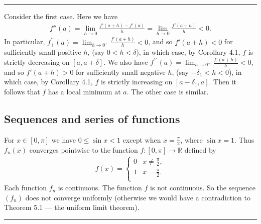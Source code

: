 \documentclass[letterpaper,10pt,english]{jupyterBook}
\begin{document}
\bigskip\hrule\bigskip


\sphinxAtStartPar
{\hyperref[\detokenize{Problems:id53}]{}} Consider the first case. Here we have
\begin{equation*}
\begin{split}
f''(a) = \lim_{h \rightarrow 0}\frac{f'(a + h) - f'(a)}{h} =  \lim_{h \rightarrow 0}\frac{f'(a + h)}{h} < 0.
\end{split}
\end{equation*}
\sphinxAtStartPar
In particular, \(f^{\prime \prime}_{+}(a) = \lim_{h \rightarrow 0^+}\frac{f'(a + h)}{h} < 0\), and so \(f'(a + h) < 0\) for sufficiently small positive \(h\), (say \(0 < h < \delta\)), in which case, by Corollary 4.1, \(f\) is strictly decreasing on \([a,  a + \delta]\). We also have \(f^{\prime \prime}_{-}(a) = \lim_{h \rightarrow 0^-}\frac{f'(a + h)}{h} < 0\), and so \(f'(a + h) > 0\) for sufficiently small negative \(h\), (say \(-\delta_{1} < h < 0\)), in which case, by Corollary 4.1, \(f\) is strictly increasing on \([a- \delta_{1}, a]\). Then it follows that \(f\) has a local minimum at \(a\). The other case is similar.


\subsection{Sequences and series of functions}
\label{\detokenize{Solutions-full:sequences-and-series-of-functions}}
\sphinxAtStartPar
{\hyperref[\detokenize{Problems:id54}]{}} For \(x\in [0,\pi ]\) we have \(0\leq \sin x<1\) except when \(x=\frac{\pi}{2}\), where \(\sin x=1\). Thus \(f_n(x)\) converges pointwise to the function \(f\colon [0, \pi ]\rightarrow \mathbb{R}\) defined by
\begin{equation*}
\begin{split}
f(x) = \left\{ \begin{array}{ll}
0 & x\neq \frac{\pi}{2}, \\
1 & x=\frac{\pi}{2}. \\
\end{array} \right.
\end{split}
\end{equation*}
\sphinxAtStartPar
Each function \(f_n\) is continuous. The function \(f\) is not continuous. So the sequence \((f_n)\) does not converge uniformly (otherwise we would have a contradiction to Theorem 5.1 — the uniform limit theorem).


\bigskip\hrule\bigskip
\end{document}
